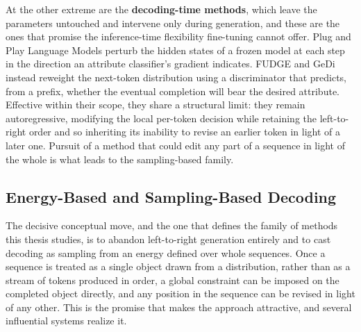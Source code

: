 At the other extreme are the \textbf{decoding-time methods}, which leave the parameters untouched and intervene only during generation, and these are the ones that promise the inference-time flexibility fine-tuning cannot offer. Plug and Play Language Models \citep{dathathri2020plug} perturb the hidden states of a frozen model at each step in the direction an attribute classifier's gradient indicates. FUDGE \citep{yang2021fudge} and GeDi \citep{krause2021gedi} instead reweight the next-token distribution using a discriminator that predicts, from a prefix, whether the eventual completion will bear the desired attribute. Effective within their scope, they share a structural limit: they remain autoregressive, modifying the local per-token decision while retaining the left-to-right order and so inheriting its inability to revise an earlier token in light of a later one. Pursuit of a method that could edit any part of a sequence in light of the whole is what leads to the sampling-based family.

\subsection{Energy-Based and Sampling-Based Decoding}
\label{sec:rel-energy}

The decisive conceptual move, and the one that defines the family of methods this thesis studies, is to abandon left-to-right generation entirely and to cast decoding as sampling from an energy defined over whole sequences. Once a sequence is treated as a single object drawn from a distribution, rather than as a stream of tokens produced in order, a global constraint can be imposed on the completed object directly, and any position in the sequence can be revised in light of any other. This is the promise that makes the approach attractive, and several influential systems realize it.

